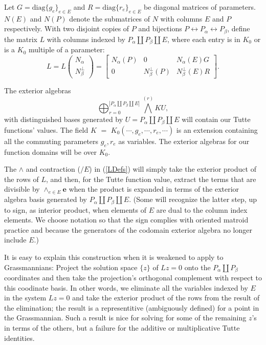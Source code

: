 \documentclass[Unicode]{cedram-alco}
\newcommand{\ext}[1]{\ensuremath{\mathbf{#1}}}
\newcommand{\Nal}{\ensuremath{N_{\alpha}}}
\newcommand{\NbePe}{\ensuremath{N_{\beta}^{\perp}}}
\newcommand{\dunion}{\coprod}
\begin{document}
Let
$G=\text{diag}\{g_e\}_{e\in E} $ and $R=\text{diag}\{r_e\}_{e\in E}$
be diagonal matrices of parameters.
$N(E)$ and $N(P)$ denote the submatrices of $N$
with columns $E$ and $P$ respectively. With
two disjoint copies of $P$ and bijections
$P \leftrightarrow P_{\alpha}\leftrightarrow P_{\beta}$, define the matrix $L$
with columns indexed by $P_\alpha \dunion P_\beta \dunion E$, where each entry
is in $K_0$ or is a $K_0$ multiple of a parameter:
\begin{equation}\label{LmatrixDef}
    L = L\left(\begin{array}{cc} {\Nal} \\ {\NbePe}  \end{array}\right)
    = \left[\begin{array}{c|c|c} \Nal(P)  &  0  &  \Nal(E)G \\  \hline
        0  & \NbePe(P)  &  \NbePe(E)R \end{array}\right].
\end{equation}


The exterior algebras
\[
\bigoplus_{r=0}^{\left|P_\alpha \dunion P_\beta \dunion E\right|} {\bigwedge}^{(r)} KU,
\]
with distinguished bases generated by $U=P_\alpha \dunion P_\beta \dunion E$
will contain our Tutte functions' values.
The 
field $K$ $=$ $K_0( \cdots, g_e , \cdots , r_e , \cdots )$
is an extension containing 
all the commuting parameters $g_e, r_e$ as variables. The
exterior algebras for our function domains will be over $K_0$.

The $\wedge$ and contraction ($/E$) in (\ref{LDefs})
will simply take the exterior product of the rows of $L$, and
then, for the Tutte function value,
extract the terms that are divisible by $\wedge_{e \in E}\ext{e}$
when the product
is expanded in terms of the exterior algebra basis
generated by $P_\alpha \dunion P_\beta \dunion E$.
(Some will recognize the latter step, up to sign, as interior product,
when elements
of $E$ are dual to the column index elements.  We choose notation
so that the sign complies with oriented matroid practice\cite{OMBOOK} and
because the generators of the codomain exterior algebra no longer include $E$.)



It is easy to explain this construction when it is weakened
to apply to Grassmannians:
Project the solution space $\{z\}$ of $Lz=0$ onto
the $P_\alpha\dunion P_\beta$ coordinates and then take the projection's orthogonal
complement with respect to this coodinate  basis.
In other words, we eliminate all the variables
indexed by $E$ in the system $Lz=0$ and take the exterior product of the rows
from the result of the elimination; the result is a 
representitive (ambiguously defined) for a point in the Grassmannian.
Such a result is nice for solving for some of the remaining $z$'s in terms of
the others, but a failure
for the additive or multiplicative Tutte identities.
\end{document}
